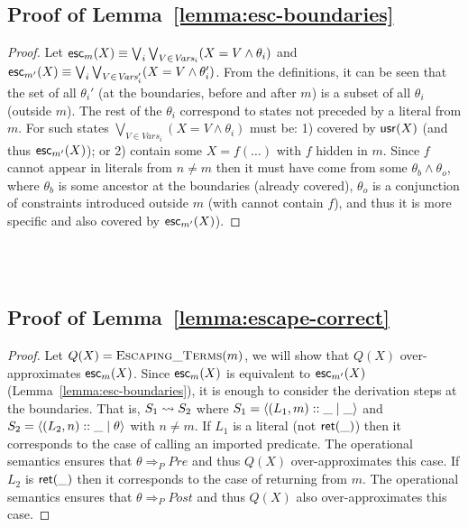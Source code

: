\documentclass{llncs}
\begin{document}
\subsection{Proof of Lemma~\ref{lemma:esc-boundaries}}

\begin{proof}
  Let $\mathsf{esc}_{m}(X) \equiv \bigvee_i \bigvee_{V \in
    \textit{Vars}_i}(X=V \wedge \theta_i)$ and
  $\mathsf{esc}_{m'}(X) \equiv \bigvee_i \bigvee_{V \in
    \textit{Vars}_i'}(X=V \wedge \theta_i')$.
  From the definitions, it can be seen that the set of all
  $\theta_i'$ (at the boundaries, before and after $m$) is a subset
  of all $\theta_i$ (outside $m$).
  The rest of the $\theta_i$ correspond to states not preceded by a
  literal from $m$. For such states $\bigvee_{V \in
    \textit{Vars}_i}(X=V \wedge \theta_i)$ must be:
  1) covered by
  $\mathsf{usr}(X)$ (and thus $\mathsf{esc}_{m'}(X)$);
  or 2) contain some $X=f(\ldots)$ with $f$ hidden in $m$. Since $f$
  cannot appear in literals from $n \neq m$ then it must have come
  from some $\theta_b \wedge \theta_o$, where $\theta_b$ is some
  ancestor at the boundaries (already covered), $\theta_o$ is a
  conjunction of constraints introduced outside $m$ (with cannot
  contain $f$), and thus it is more specific and also covered by
  $\mathsf{esc}_{m'}(X)$).
\end{proof}

\ \\
\ \\
\subsection{Proof of Lemma~\ref{lemma:escape-correct}}

\begin{proof}
  Let $Q(X) = \textsc{Escaping\_Terms}(m)$, we will show that $Q(X)$
  over-approximates $\mathsf{esc}_{m}(X)$.
  Since $\mathsf{esc}_{m}(X)$ is equivalent to $\mathsf{esc}_{m'}(X)$
  (Lemma~\ref{lemma:esc-boundaries}), it is enough to consider the
  derivation steps at the boundaries. That is, $S_1 \leadsto S_2$
  where $S_1 = \langle (L_1,m)::\_ \mid{} \_ \rangle$
  and $S_2 = \langle (L_2,n)::\_ \mid{} \theta \rangle$ with $n \neq m$.
  If $L_1$ is a literal (not $\textsf{ret}(\_)$) then it corresponds to the
  case of calling an imported predicate. The operational semantics
  ensures that $\theta \Rightarrow_{P} Pre$ and thus $Q(X)$
  over-approximates this case.
  If $L_2$ is $\textsf{ret}(\_)$ then it corresponds to the case of
  returning from $m$. The operational semantics ensures that $\theta
  \Rightarrow_{P} Post$ and thus $Q(X)$ also over-approximates this
  case.
\end{proof}
\end{document}
